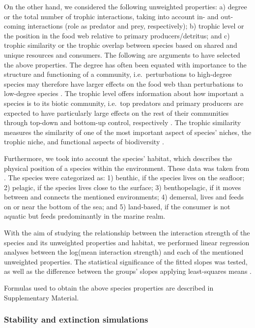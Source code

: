 \documentclass[gc, manuscript]{copernicus}
\begin{document}
On the other hand, we considered the following unweighted properties: a)
degree or the total number of trophic interactions, taking into account
in- and out-coming interactions (role as predator and prey,
respectively); b) trophic level or the position in the food web relative
to primary producers/detritus; and c) trophic similarity or the trophic
overlap between species based on shared and unique resources and
consumers. The following are arguments to have selected the above
properties. The degree has often been equated with importance to the
structure and functioning of a community, i.e.~perturbations to
high-degree species may therefore have larger effects on the food web
than perturbations to low-degree species
\citetext{\citealp{Dunne2002a}; \citealp[references
in][]{Cirtwill2018a}}. The trophic level offers information about how
important a species is to its biotic community, i.e.~top predators and
primary producers are expected to have particularly large effects on the
rest of their communities through top-down and bottom-up control,
respectively \citep[references in][]{Cirtwill2018a}. The trophic
similarity measures the similarity of one of the most important aspect
of species' niches, the trophic niche, and functional aspects of
biodiversity \citep{Martinez1991, Williams2000}.

Furthermore, we took into account the species' habitat, which describes
the physical position of a species within the environment. These data
was taken from \citet{Jacob2011}. The species were categorized as: 1)
benthic, if the species lives on the seafloor; 2) pelagic, if the
species lives close to the surface; 3) benthopelagic, if it moves
between and connects the mentioned environments; 4) demersal, lives and
feeds on or near the bottom of the sea; and 5) land-based, if the
consumer is not aquatic but feeds predominantly in the marine realm.

With the aim of studying the relationship between the interaction
strength of the species and its unweighted properties and habitat, we
performed linear regression analyses between the log(mean interaction
strength) and each of the mentioned unweighted properties. The
statistical significance of the fitted slopes was tested, as well as the
difference between the groups' slopes applying least-squares means
\citep{Harvey1960}.

Formulas used to obtain the above species properties are described in
Supplementary Material.

\subsubsection{Stability and extinction simulations}
\end{document}
